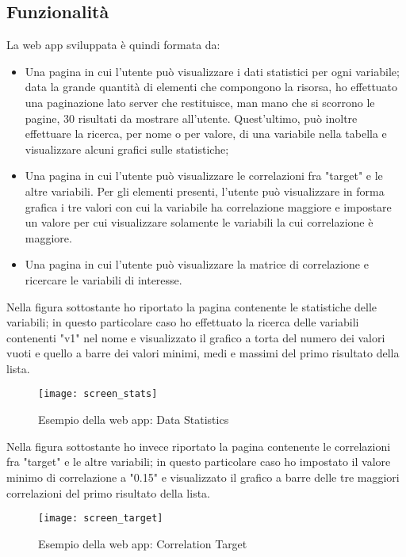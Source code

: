 \subsection{Funzionalità}
La \gls{web app} sviluppata è quindi formata da:
\begin{itemize}
	\item Una pagina in cui l'utente può visualizzare i dati statistici per ogni variabile; data la grande quantità di elementi che compongono la risorsa, ho effettuato una paginazione lato server che restituisce, man mano che si scorrono le pagine, 30 risultati da mostrare all'utente. Quest'ultimo, può inoltre effettuare la ricerca, per nome o per valore, di una variabile nella tabella e visualizzare alcuni grafici sulle statistiche;
	\item Una pagina in cui l'utente può visualizzare le correlazioni fra "target" e le altre variabili. Per gli elementi presenti, l'utente può visualizzare in forma grafica i tre valori con cui la variabile ha correlazione maggiore e impostare un valore per cui visualizzare solamente le variabili la cui correlazione è maggiore.
	\item Una pagina in cui l'utente può visualizzare la matrice di correlazione e ricercare le variabili di interesse.
\end{itemize}
Nella figura sottostante ho riportato la pagina contenente le statistiche delle variabili; in questo particolare caso ho effettuato la ricerca delle variabili contenenti "v1" nel nome e visualizzato il grafico a torta del numero dei valori vuoti e quello a barre dei valori minimi, medi e massimi del primo risultato della lista.\\
\begin{figure}[!h]
	\centering
	\texttt{[image: screen\_stats]}
	\caption{Esempio della web app: Data Statistics}
\end{figure}
\clearpage
\noindent Nella figura sottostante ho invece riportato la pagina contenente le correlazioni fra "target" e le altre variabili; in questo particolare caso ho impostato il valore minimo di correlazione a "0.15" e visualizzato il grafico a barre delle tre maggiori correlazioni del primo risultato della lista.\\
\begin{figure}[!h]
	\centering
	\texttt{[image: screen\_target]}
	\caption{Esempio della web app: Correlation Target}
\end{figure}

\newpage
